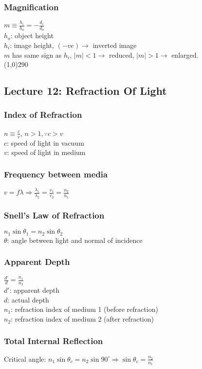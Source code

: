 \documentclass[10 pt]{article}
\begin{document}
\begin{multicols}{2}
\subsubsection*{Magnification}
$m \equiv \frac{h_{i}}{h_{o}} = - \frac{d_{i}}{d_{o}}$ \\
$h_{o}$: object height \\
$h_{i}$: image height, $(-ve) \rightarrow$ inverted image \\
$m$ has same sign as $h_{i}$, $|m|<1 \rightarrow$ reduced, $|m|>1 \rightarrow$ enlarged. \\
\line(1,0){290}
\subsection*{Lecture 12: Refraction Of Light}
\subsubsection*{Index of Refraction}
$n \equiv \frac{c}{v}$, $n>1, \because c>v$ \\
$c$: speed of light in vacuum \\
$v$: speed of light in medium
\subsubsection*{Frequency between media}
$v=f\lambda \Rightarrow \frac{\lambda_{1}}{\lambda_{2}} = \frac{v_{1}}{v_{2}} = \frac{n_{2}}{n_{1}}$
\subsubsection*{Snell's Law of Refraction}
$n_{1}\sin{\theta_{1}} = n_{2}\sin{\theta_{2}}$ \\
$\theta$: angle between light and normal of incidence
\subsubsection*{Apparent Depth}
$\frac{d'}{d} = \frac{n_{1}}{n_{2}}$ \\
$d'$: apparent depth \\
$d$: actual depth \\
$n_{1}$: refraction index of medium 1 (before refraction) \\
$n_{2}$: refraction index of medium 2 (after refraction)
\subsubsection*{Total Internal Reflection}
Critical angle: $n_1 \sin{\theta_c} = n_2 \sin{90^{\circ}} \Rightarrow \sin{\theta_{c}} = \frac{n_{2}}{n_{1}}$

\end{multicols}
\end{document}
